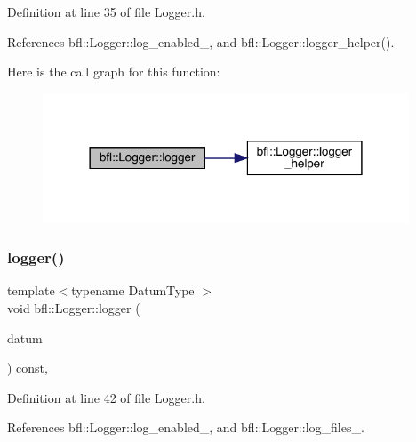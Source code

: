 Definition at line 35 of file Logger.\+h.



References bfl\+::\+Logger\+::log\+\_\+enabled\+\_\+, and bfl\+::\+Logger\+::logger\+\_\+helper().

Here is the call graph for this function\+:
\nopagebreak
\begin{figure}[H]
\begin{center}
\leavevmode
\includegraphics[width=309pt]{classbfl_1_1Logger_aca2086c9256e5c404872b91f7f25b97d_cgraph}
\end{center}
\end{figure}
\mbox{\label{classbfl_1_1Logger_a50b1c109730fa98f66e66f420f0158fe}} 
\subsubsection{\texorpdfstring{logger()}{logger()}\hspace{0.1cm}{\footnotesize\ttfamily [3/4]}}
{\footnotesize\ttfamily template$<$typename Datum\+Type $>$ \\
void bfl\+::\+Logger\+::logger (\begin{DoxyParamCaption}\item[{Datum\+Type}]{datum }\end{DoxyParamCaption}) const\hspace{0.3cm}{\ttfamily [inline]}, {\ttfamily [inherited]}}



Definition at line 42 of file Logger.\+h.



References bfl\+::\+Logger\+::log\+\_\+enabled\+\_\+, and bfl\+::\+Logger\+::log\+\_\+files\+\_\+.

\mbox{\label{classbfl_1_1Logger_a0f0cf7ce956546d94dfb1feb7cebf171}} 
